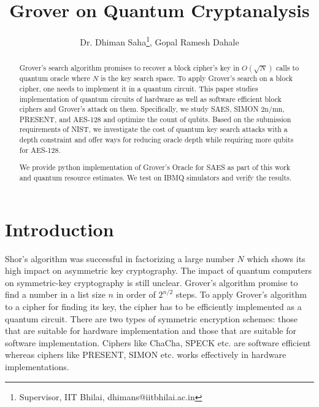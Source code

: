 \documentclass[preprint]{transcrypto}
\author{Dr. Dhiman Saha\footnote{Supervisor, IIT Bhilai, dhimans@iitbhilai.ac.in}, Gopal Ramesh Dahale}
\institute{
  11840520, IIT Bhilai, \email{gopald@iitbhilai.ac.in}
}
\title{Grover on Quantum Cryptanalysis}
\begin{document}
\maketitle



\begin{abstract}
Grover's search algorithm promises to recover a block cipher's key in $O(\sqrt{N})$ calls to quantum oracle where $N$ is the key search space. To apply Grover's search on a block cipher, one needs to implement it in a quantum circuit. This paper studies implementation of quantum circuits of hardware as well as software efficient block ciphers and Grover's attack on them. Specifically, we study SAES, SIMON 2n/mn, PRESENT, and AES-128 and optimize the count of qubits. Based on the submission requirements of NIST, we investigate the cost of quantum key search attacks with a depth constraint and offer ways for reducing oracle depth while requiring more qubits for AES-128. 

We provide python implementation of Grover's Oracle for SAES as part of this work and quantum resource estimates. We test on IBMQ simulators and verify the results.

\end{abstract}

\section{Introduction}
\scalebox{.5}

Shor's algorithm was successful in factorizing a large number $N$ which shows its high impact on asymmetric key cryptography. The impact of quantum computers on symmetric-key cryptography is still unclear. Grover's algorithm promise to find a number in a list size $n$ in order of $2^{n/2}$ steps. To apply Grover's algorithm to a cipher for finding its key, the cipher has to be efficiently implemented as a quantum circuit. There are two types of symmetric encryption schemes: those that are suitable for hardware implementation and those that are suitable for software implementation. Ciphers like ChaCha\cite{ChaCha}, SPECK\cite{SimonSpeck} etc. are software efficient whereas ciphers like PRESENT\cite{present}, SIMON\cite{SimonSpeck} etc. works effectively in hardware implementations.
\end{document}
